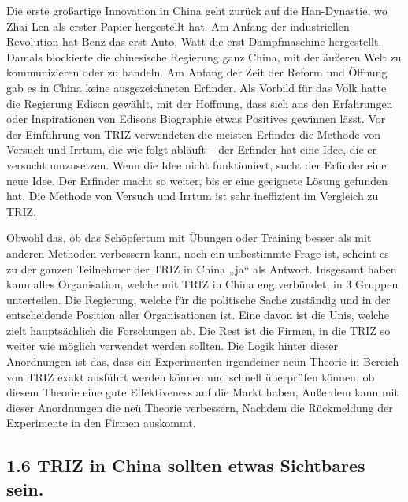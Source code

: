 \documentclass[11pt,a4paper]{article}
\begin{document}
Die erste großartige Innovation in China geht zurück auf die Han-Dynastie, wo
Zhai Len als erster Papier hergestellt hat. Am Anfang der industriellen
Revolution hat Benz das erst Auto, Watt die erst Dampfmaschine hergestellt.
Damals blockierte die chinesische Regierung ganz China, mit der äußeren Welt
zu kommunizieren oder zu handeln. Am Anfang der Zeit der Reform und Öffnung
gab es in China keine ausgezeichneten Erfinder. Als Vorbild für das Volk hatte
die Regierung Edison gewählt, mit der Hoffnung, dass sich aus den Erfahrungen
oder Inspirationen von Edisons Biographie etwas Positives gewinnen lässt. Vor
der Einführung von TRIZ verwendeten die meisten Erfinder die Methode von
Versuch und Irrtum, die wie folgt abläuft -- der Erfinder hat eine Idee, die
er versucht umzusetzen. Wenn die Idee nicht funktioniert, sucht der Erfinder
eine neue Idee. Der Erfinder macht so weiter, bis er eine geeignete Lösung
gefunden hat. Die Methode von Versuch und Irrtum ist sehr ineffizient im
Vergleich zu TRIZ.

Obwohl das, ob das Schöpfertum mit Übungen oder Training besser als mit
anderen Methoden verbessern kann, noch ein unbestimmte Frage ist, scheint es
zu der ganzen Teilnehmer der TRIZ in China  „ja“ als Antwort. Insgesamt haben
kann alles Organisation, welche mit TRIZ in China eng verbündet, in 3 Gruppen
unterteilen. Die Regierung, welche für die politische Sache zuständig und in
der entscheidende Position aller Organisationen ist. Eine davon ist die Unis,
welche zielt hauptsächlich die Forschungen ab. Die Rest ist die Firmen, in die
TRIZ so weiter wie möglich verwendet werden sollten. Die Logik hinter dieser
Anordnungen ist das, dass ein Experimenten irgendeiner neün Theorie in
Bereich von TRIZ exakt ausführt werden können und schnell überprüfen können,
ob diesem Theorie eine gute Effektiveness auf die Markt haben, Außerdem kann
mit dieser Anordnungen die neü Theorie verbessern, Nachdem die Rückmeldung
der Experimente in den Firmen auskommt.   

\subsection{1.6 TRIZ in China sollten etwas Sichtbares sein.}
\end{document}
